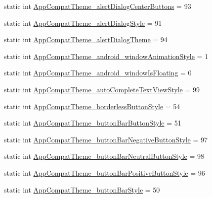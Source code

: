 \begin{DoxyCompactItemize}
\item 
static int \hyperlink{classandroid_1_1support_1_1v7_1_1cardview_1_1R_1_1styleable_af83656dc4de3b9d3f32fcd07ff7b8892}{App\+Compat\+Theme\+\_\+alert\+Dialog\+Center\+Buttons} = 93
\item 
static int \hyperlink{classandroid_1_1support_1_1v7_1_1cardview_1_1R_1_1styleable_a09318e393d7df2f7968716e2d1c1a214}{App\+Compat\+Theme\+\_\+alert\+Dialog\+Style} = 91
\item 
static int \hyperlink{classandroid_1_1support_1_1v7_1_1cardview_1_1R_1_1styleable_acfcfac63c3692a282515b5e87698c92f}{App\+Compat\+Theme\+\_\+alert\+Dialog\+Theme} = 94
\item 
static int \hyperlink{classandroid_1_1support_1_1v7_1_1cardview_1_1R_1_1styleable_a3b2eccca8b00b0eb575d2021f078cbb8}{App\+Compat\+Theme\+\_\+android\+\_\+window\+Animation\+Style} = 1
\item 
static int \hyperlink{classandroid_1_1support_1_1v7_1_1cardview_1_1R_1_1styleable_a4c9f6f32c92062c411f5c4c6fe2b1da4}{App\+Compat\+Theme\+\_\+android\+\_\+window\+Is\+Floating} = 0
\item 
static int \hyperlink{classandroid_1_1support_1_1v7_1_1cardview_1_1R_1_1styleable_ae014b1ac4a3413251376574568270a19}{App\+Compat\+Theme\+\_\+auto\+Complete\+Text\+View\+Style} = 99
\item 
static int \hyperlink{classandroid_1_1support_1_1v7_1_1cardview_1_1R_1_1styleable_ac59aefe71e126f596474d5fa2287b1ce}{App\+Compat\+Theme\+\_\+borderless\+Button\+Style} = 54
\item 
static int \hyperlink{classandroid_1_1support_1_1v7_1_1cardview_1_1R_1_1styleable_afd2644581cb07d6cd4ed27a053bf6525}{App\+Compat\+Theme\+\_\+button\+Bar\+Button\+Style} = 51
\item 
static int \hyperlink{classandroid_1_1support_1_1v7_1_1cardview_1_1R_1_1styleable_a3f0d3655b3dc02d0f7f8bac6422802ad}{App\+Compat\+Theme\+\_\+button\+Bar\+Negative\+Button\+Style} = 97
\item 
static int \hyperlink{classandroid_1_1support_1_1v7_1_1cardview_1_1R_1_1styleable_afc6ef0b8097f2e788fe27aed74360c29}{App\+Compat\+Theme\+\_\+button\+Bar\+Neutral\+Button\+Style} = 98
\item 
static int \hyperlink{classandroid_1_1support_1_1v7_1_1cardview_1_1R_1_1styleable_abfba42dac502deb993340e486ec71e30}{App\+Compat\+Theme\+\_\+button\+Bar\+Positive\+Button\+Style} = 96
\item 
static int \hyperlink{classandroid_1_1support_1_1v7_1_1cardview_1_1R_1_1styleable_a79edaebda634ee0aecb95bc0b4d88a2b}{App\+Compat\+Theme\+\_\+button\+Bar\+Style} = 50

\end{DoxyCompactItemize}
